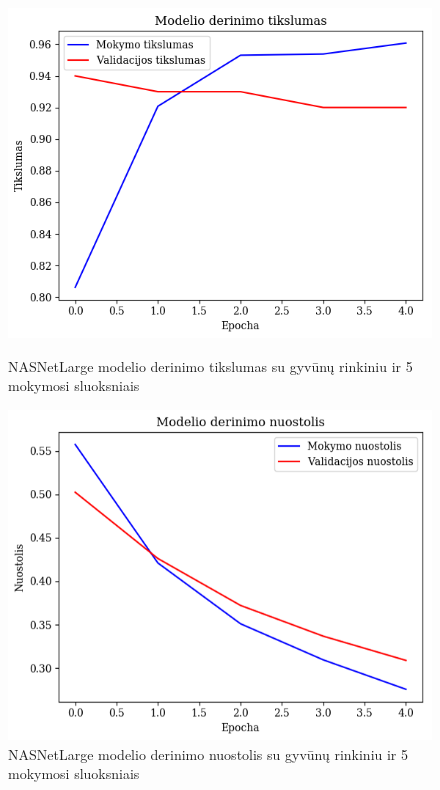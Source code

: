 \documentclass{VUMIFPSbakalaurinis}
\begin{document}
\begin{figure}[!htbp]
    \centering
    \begin{minipage}[b]{0.48\textwidth}
      \includegraphics[width=\textwidth]{img/GrapthsNEW/Large/animal/5/Acc_DC_L_5.png}
      \caption{NASNetLarge modelio derinimo tikslumas su gyvūnų rinkiniu ir 5 mokymosi sluoksniais}
    \end{minipage}
    \hspace{2mm}
    \begin{minipage}[b]{0.48\textwidth}
      \includegraphics[width=\textwidth]{img/GrapthsNEW/Large/animal/5/Loss_DC_L_5.png}
      \caption{NASNetLarge modelio derinimo nuostolis su gyvūnų rinkiniu ir 5 mokymosi sluoksniais}
    \end{minipage}
\end{figure}
\end{document}
